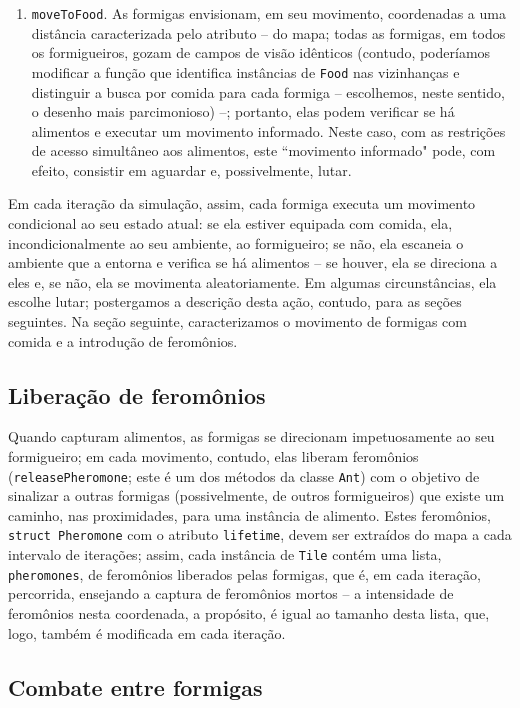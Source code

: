 \documentclass[12pt]{article}
\theoremstyle{definition}
\begin{document}
\begin{enumerate}
	\item \texttt{moveToFood}. As formigas envisionam, em seu movimento, coordenadas a uma distância caracterizada pelo atributo -- do mapa; todas as formigas, em todos os formigueiros, gozam de campos de visão idênticos (contudo, poderíamos modificar a função que identifica instâncias de \texttt{Food} nas vizinhanças e distinguir a busca por comida para cada formiga -- escolhemos, neste sentido, o desenho mais parcimonioso) --; portanto, elas podem verificar se há alimentos e executar um movimento informado. Neste caso, com as restrições de acesso simultâneo aos alimentos, este ``movimento informado" pode, com efeito, consistir em aguardar e, possivelmente, lutar.  
\end{enumerate} 

Em cada iteração da simulação, assim, cada formiga executa um movimento condicional ao seu estado atual: se ela estiver equipada com comida, ela, incondicionalmente ao seu ambiente, ao formigueiro; se não, ela escaneia o ambiente que a entorna e verifica se há alimentos -- se houver, ela se direciona a eles e, se não, ela se movimenta aleatoriamente. Em algumas circunstâncias, ela escolhe lutar; postergamos a descrição desta ação, contudo, para as seções seguintes. Na seção seguinte, caracterizamos o movimento de formigas com comida e a introdução de feromônios. 

\subsection{Liberação de feromônios} 

Quando capturam alimentos, as formigas se direcionam impetuosamente ao seu formigueiro; em cada movimento, contudo, elas liberam feromônios (\texttt{releasePheromone}; este é um dos métodos da classe \texttt{Ant}) com o objetivo de sinalizar a outras formigas (possivelmente, de outros formigueiros) que existe um caminho, nas proximidades, para uma instância de alimento. Estes feromônios, \texttt{struct Pheromone} com o atributo \texttt{lifetime}, devem ser extraídos do mapa a cada intervalo de iterações; assim, cada instância de \texttt{Tile} contém uma lista, \texttt{pheromones}, de feromônios liberados pelas formigas, que é, em cada iteração, percorrida, ensejando a captura de feromônios mortos -- a intensidade de feromônios nesta coordenada, a propósito, é igual ao tamanho desta lista, que, logo, também é modificada em cada iteração. 

\subsection{Combate entre formigas} 
\end{document}
